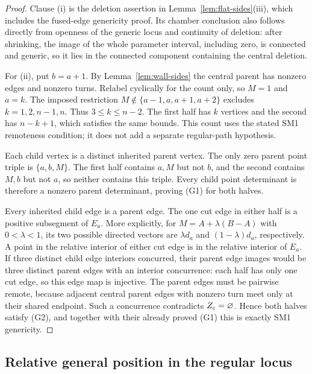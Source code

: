 \begin{proof}
Clause (i) is the deletion assertion in
Lemma~\ref{lem:flat-sides}(iii), which includes the fused-edge
genericity proof. Its chamber conclusion also follows directly from openness
of the generic locus and continuity of deletion: after shrinking, the image
of the whole parameter interval, including zero, is connected and generic,
so it lies in the connected component containing the central deletion.

For (ii), put $b=a+1$. By Lemma~\ref{lem:wall-sides} the central parent
has nonzero edges and nonzero turns. Relabel cyclically for the count only,
so $M=1$ and $a=k$. The imposed restriction
$M\notin\{a-1,a,a+1,a+2\}$ excludes $k=1,2,n-1,n$. Thus
$3\leq k\leq n-2$. The first half has $k$ vertices and the second has
$n-k+1$, which satisfies the same bounds. This count uses the stated SM1
remoteness condition; it does not add a separate regular-path hypothesis.

Each child vertex is a distinct inherited parent vertex. The only zero
parent point triple is $\{a,b,M\}$. The first half contains $a,M$ but not
$b$, and the second contains $M,b$ but not $a$, so neither contains this
triple. Every child point determinant is therefore a nonzero parent
determinant, proving (G1) for both halves.

Every inherited child edge is a parent edge. The one cut edge in either
half is a positive subsegment of $E_a$. More explicitly, for
$M=A+\lambda(B-A)$ with $0<\lambda<1$, its two possible directed vectors
are $\lambda d_a$ and $(1-\lambda)d_a$, respectively. A point in the
relative interior of either cut edge is in the relative interior of $E_a$.
If three distinct child edge interiors concurred, their parent edge images
would be three distinct parent edges with an interior concurrence: each
half has only one cut edge, so this edge map is injective. The parent edges
must be pairwise remote, because adjacent central parent edges with nonzero
turn meet only at their shared endpoint. Such a concurrence contradicts
$Z_{\rm c}=\varnothing$. Hence both halves satisfy (G2), and together with
their already proved (G1) this is exactly SM1 genericity.
\end{proof}

\subsection{Relative general position in the regular locus}


